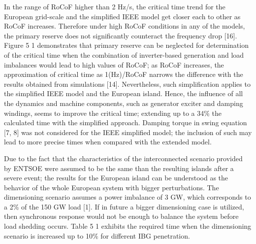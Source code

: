 In the range of RoCoF higher than 2 Hz/s, the critical time trend for the European grid-scale and the simplified IEEE model get closer each to other as RoCoF increases. Therefore under high RoCoF conditions in any of the models, the primary reserve does not significantly counteract the frequency drop [16]. Figure 5 1 demonstrates that primary reserve can be neglected for determination of the critical time when the combination of inverter-based generation and load imbalances would lead to high values of RoCoF; as RoCoF increases, the approximation of critical time as 1(Hz)/RoCoF narrows the difference with the results obtained from simulations [14].
Nevertheless, such simplification applies to the simplified IEEE model and the European island. Hence, the influence of all the dynamics and machine components, such as
generator exciter and damping windings, seems to improve the critical time; extending up to a 34\% the calculated time with the simplified approach. Damping torque in swing equation [7, 8] was not considered for the IEEE simplified model; the inclusion of such may lead to more precise times when compared with the extended model.


Due to the fact that the characteristics of the interconnected scenario provided by ENTSOE were assumed to be the same than the resulting islands after a severe event; the results for the European island can be understood as the behavior of the whole European system with bigger perturbations. The dimensioning scenario assumes a power imbalance of 3 GW, which corresponds to a 2\% of the 150 GW load [1]. If in future a bigger dimensioning case is utilized, then synchronous response would not be enough to balance the system before load shedding occurs. Table 5 1 exhibits the required time when the dimensioning scenario is increased up to 10\% for different IBG penetration.


